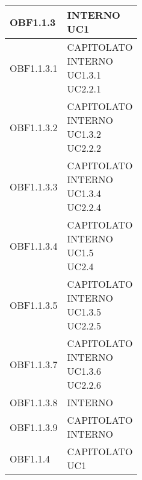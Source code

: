 \documentclass{scalatekids-article}
\begin{document}
\begin{longtable}[H]{|p{5.5cm}|p{5.5cm}|}
  \hline
  OBF1.1.3 & \multiLineCell[t]{INTERNO\\UC1\\}\\
  \hline
  OBF1.1.3.1 & \multiLineCell[t]{CAPITOLATO\\INTERNO\\UC1.3.1\\UC2.2.1\\}\\
  \hline
  OBF1.1.3.2 & \multiLineCell[t]{CAPITOLATO\\INTERNO\\UC1.3.2\\UC2.2.2\\}\\
  \hline
  OBF1.1.3.3 & \multiLineCell[t]{CAPITOLATO\\INTERNO\\UC1.3.4\\UC2.2.4\\}\\
  \hline
  OBF1.1.3.4 & \multiLineCell[t]{CAPITOLATO\\INTERNO\\UC1.5\\UC2.4\\}\\
  \hline
  OBF1.1.3.5 & \multiLineCell[t]{CAPITOLATO\\INTERNO\\UC1.3.5\\UC2.2.5\\}\\
  \hline
  OBF1.1.3.7 & \multiLineCell[t]{CAPITOLATO\\INTERNO\\UC1.3.6\\UC2.2.6\\}\\
  \hline
  OBF1.1.3.8 & \multiLineCell[t]{INTERNO\\}\\
  \hline
  OBF1.1.3.9 & \multiLineCell[t]{CAPITOLATO\\INTERNO\\}\\
  \hline
  OBF1.1.4 & \multiLineCell[t]{CAPITOLATO\\UC1\\}\\

\end{longtable}
\end{document}
